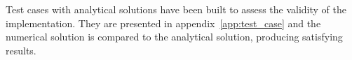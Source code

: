 Test cases with analytical solutions have been built to assess the validity of the implementation. They are presented in appendix~\ref{app:test_case} and the numerical solution is compared to the analytical solution, producing satisfying results.
% 
